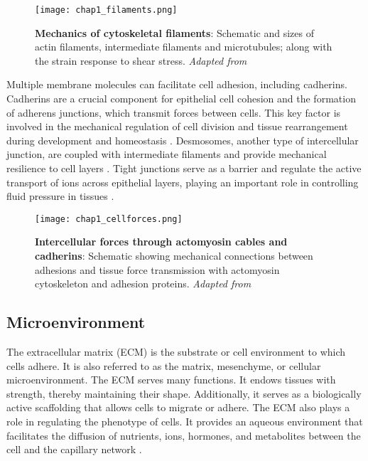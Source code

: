 \begin{figure}[h!]
	\centering
	\texttt{[image: chap1\_filaments.png]}
	\caption{\label{fig_1_3b} \textbf{Mechanics of cytoskeletal filaments}: Schematic and sizes of actin filaments, intermediate filaments and microtubules; along with the strain response to shear stress. \textit{Adapted from \cite{leggett2021}}}
\end{figure}

Multiple membrane molecules can facilitate cell adhesion, including cadherins. Cadherins are a crucial component for epithelial cell cohesion and the formation of adherens junctions, which transmit forces between cells. This key factor is involved in the mechanical regulation of cell division and tissue rearrangement during development and homeostasis \cite{godard2019, mertz2013}. Desmosomes, another type of intercellular junction, are coupled with intermediate filaments and provide mechanical resilience to cell layers \cite{hatzfeld2017, latorre2018}. Tight junctions serve as a barrier and regulate the active transport of ions across epithelial layers, playing an important role in controlling fluid pressure in tissues \cite{marchiando2010, chan2020}.

\begin{figure}[H]
	\centering
	\texttt{[image: chap1\_cellforces.png]}
	\caption{\label{fig_1_3} \textbf{Intercellular forces through actomyosin cables and cadherins}: Schematic showing mechanical connections between adhesions and tissue force transmission with actomyosin cytoskeleton and adhesion proteins. \textit{Adapted from \cite{ladoux2017}}}
\end{figure}

\hypertarget{microenvironment}{%
	\subsection{Microenvironment}\label{microenvironment}}

The extracellular matrix (ECM) is the substrate or cell environment to which cells adhere. It is also referred to as the matrix, mesenchyme, or cellular microenvironment. The ECM serves many functions. It endows tissues with strength, thereby maintaining their shape. Additionally, it serves as a biologically active scaffolding that allows cells to migrate or adhere. The ECM also plays a role in regulating the phenotype of cells. It provides an aqueous environment that facilitates the diffusion of nutrients, ions, hormones, and metabolites between the cell and the capillary network \cite{alberts2015}.

